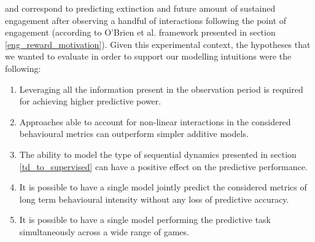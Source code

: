 and correspond to predicting extinction and future amount of sustained engagement after observing a handful of interactions following the point of engagement (according to O'Brien et al. \cite{o2008user} framework presented in section \ref{eng_reward_motivation}). Given this experimental context, the hypotheses that we wanted to evaluate in order to support our modelling intuitions were the following:
\begin{enumerate}
    \item Leveraging all the information present in the observation period is required for achieving higher predictive power.
    \item Approaches able to account for non-linear interactions in the considered behavioural metrics can outperform simpler additive models.
    \item The ability to model the type of sequential dynamics presented in section \ref{td_to_supervised} can have a positive effect on the predictive performance.
    \item It is possible to have a single model jointly predict the considered metrics of long term behavioural intensity without any loss of predictive accuracy.
    \item It is possible to have a single model performing the predictive task simultaneously across a wide range of games.
\end{enumerate}

